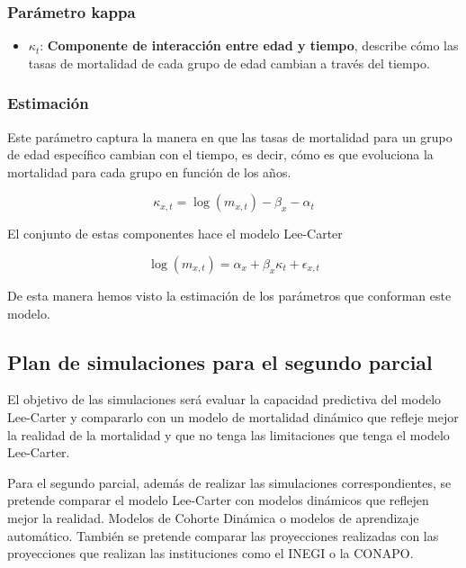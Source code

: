 \documentclass[
]{article}
\providecommand{\tightlist}{%
  \setlength{\itemsep}{0pt}\setlength{\parskip}{0pt}}
\begin{document}
\clearpage

\hypertarget{paruxe1metro-kappa}{%
\subsubsection{Parámetro kappa}\label{paruxe1metro-kappa}}

\begin{itemize}
\tightlist
\item
  \(\kappa_t\): \textbf{Componente de interacción entre edad y tiempo},
  describe cómo las tasas de mortalidad de cada grupo de edad cambian a
  través del tiempo.
\end{itemize}

\hypertarget{estimaciuxf3n-2}{%
\subsubsection{Estimación}\label{estimaciuxf3n-2}}

Este parámetro captura la manera en que las tasas de mortalidad para un
grupo de edad específico cambian con el tiempo, es decir, cómo es que
evoluciona la mortalidad para cada grupo en función de los años.

\[
\kappa_{x,t} = \log(m_{x,t}) - \beta_x - \alpha_t
\]

El conjunto de estas componentes hace el modelo Lee-Carter

\[
\log(m_{x,t}) = \alpha_x + \beta_x \kappa_t + \epsilon_{x,t}
\]

De esta manera hemos visto la estimación de los parámetros que conforman
este modelo.

\hypertarget{plan-de-simulaciones-para-el-segundo-parcial}{%
\subsection{Plan de simulaciones para el segundo
parcial}\label{plan-de-simulaciones-para-el-segundo-parcial}}

El objetivo de las simulaciones será evaluar la capacidad predictiva del
modelo Lee-Carter y compararlo con un modelo de mortalidad dinámico que
refleje mejor la realidad de la mortalidad y que no tenga las
limitaciones que tenga el modelo Lee-Carter.

Para el segundo parcial, además de realizar las simulaciones
correspondientes, se pretende comparar el modelo Lee-Carter con modelos
dinámicos que reflejen mejor la realidad. Modelos de Cohorte Dinámica o
modelos de aprendizaje automático. También se pretende comparar las
proyecciones realizadas con las proyecciones que realizan las
instituciones como el INEGI o la CONAPO.
\end{document}
